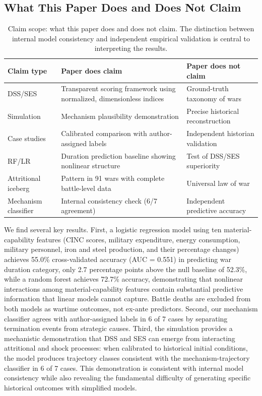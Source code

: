 \subsection{What This Paper Does and Does Not Claim}

\begin{table}[H]
\centering
\small
\setlength{\tabcolsep}{4pt}
\renewcommand{\arraystretch}{1.12}
\caption{Claim scope: what this paper does and does not claim. The distinction between internal model consistency and independent empirical validation is central to interpreting the results.}
\label{tab:scope}
\begin{tabularx}{\textwidth}{@{}
>{\RaggedRight\arraybackslash}p{}
>{\RaggedRight\arraybackslash}X
>{\RaggedRight\arraybackslash}X
@{}}
\toprule
\textbf{Claim type} & \textbf{Paper does claim} & \textbf{Paper does not claim} \\
\midrule
DSS/SES & Transparent scoring framework using normalized, dimensionless indices & Ground-truth taxonomy of wars \\
Simulation & Mechanism plausibility demonstration & Precise historical reconstruction \\
Case studies & Calibrated comparison with author-assigned labels & Independent historian validation \\
RF/LR & Duration prediction baseline showing nonlinear structure & Test of DSS/SES superiority \\
Attritional iceberg & Pattern in 91 wars with complete battle-level data & Universal law of war \\
Mechanism classifier & Internal consistency check (6/7 agreement) & Independent predictive accuracy \\
\bottomrule
\end{tabularx}
\end{table}

We find several key results. First, a logistic regression model using ten material-capability features (CINC scores, military expenditure, energy consumption, military personnel, iron and steel production, and their percentage changes) achieves 55.0\% cross-validated accuracy (AUC = 0.551) in predicting war duration category, only 2.7 percentage points above the null baseline of 52.3\%, while a random forest achieves 72.7\% accuracy, demonstrating that nonlinear interactions among material-capability features contain substantial predictive information that linear models cannot capture. Battle deaths are excluded from both models as wartime outcomes, not ex-ante predictors. Second, our mechanism classifier agrees with author-assigned labels in 6 of 7 cases by separating termination events from strategic causes. Third, the simulation provides a mechanistic demonstration that DSS and SES can emerge from interacting attritional and shock processes: when calibrated to historical initial conditions, the model produces trajectory classes consistent with the mechanism-trajectory classifier in 6 of 7 cases. This demonstration is consistent with internal model consistency while also revealing the fundamental difficulty of generating specific historical outcomes with simplified models.

